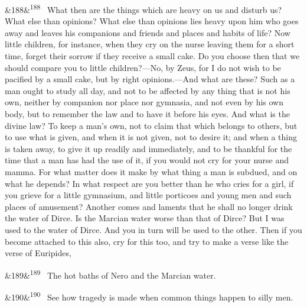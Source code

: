 \documentclass[12pt]{article}
\newcommand{\para}[1][]{\par\noindent\ifx&#1&\else\textsuperscript{\footnotesize #1}~\fi}
\begin{document}
\para[188] What then are the things which are heavy on us and disturb us? What else than opinions? What else than opinions lies heavy upon him who goes away and leaves his companions and friends and places and habits of life? Now little children, for instance, when they cry on the nurse leaving them for a short time, forget their sorrow if they receive a small cake. Do you choose then that we should compare you to little children?—No, by Zeus, for I do not wish to be pacified by a small cake, but by right opinions.—And what are these? Such as a man ought to study all day, and not to be affected by any thing that is not his own, neither by companion nor place nor gymnasia, and not even by his own body, but to remember the law and to have it before his eyes. And what is the divine law? To keep a man's own, not to claim that which belongs to others, but to use what is given, and when it is not given, not to desire it; and when a thing is taken away, to give it up readily and immediately, and to be thankful for the time that a man has had the use of it, if you would not cry for your nurse and mamma. For what matter does it make by what thing a man is subdued, and on what he depends? In what respect are you better than he who cries for a girl, if you grieve for a little gymnasium, and little porticoes and young men and such places of amusement? Another comes and laments that he shall no longer drink the water of Dirce. Is the Marcian water worse than that of Dirce? But I was used to the water of Dirce. And you in turn will be used to the other. Then if you become attached to this also, cry for this too, and try to make a verse like the verse of Euripides,

\para[189] The hot baths of Nero and the Marcian water.

\para[190] See how tragedy is made when common things happen to silly men.
\end{document}
